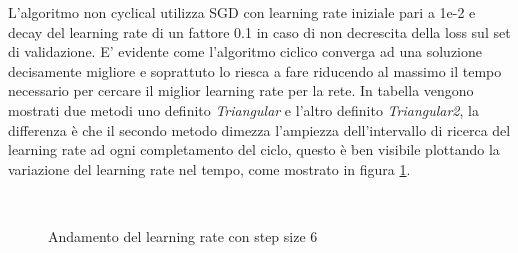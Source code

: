 L'algoritmo non cyclical utilizza SGD con learning rate iniziale pari a 1e-2 e decay del learning rate di un fattore 0.1 in caso di non decrescita della loss sul set di validazione. E' evidente come l'algoritmo ciclico converga ad una soluzione decisamente migliore e soprattuto lo riesca a fare riducendo al massimo il tempo necessario per cercare il miglior learning rate per la rete.
In tabella vengono mostrati due metodi uno definito \textit{Triangular} e l'altro definito \textit{Triangular2}, la differenza è che il secondo metodo dimezza l'ampiezza dell'intervallo di ricerca del learning rate ad ogni completamento del ciclo, questo è ben visibile plottando la variazione del learning rate nel tempo, come mostrato in figura \ref{i_lr_tr}.

\begin{figure}[H]
\\
\caption{Andamento del learning rate con step size 6}
\label{i_lr_tr}
\end{figure}


